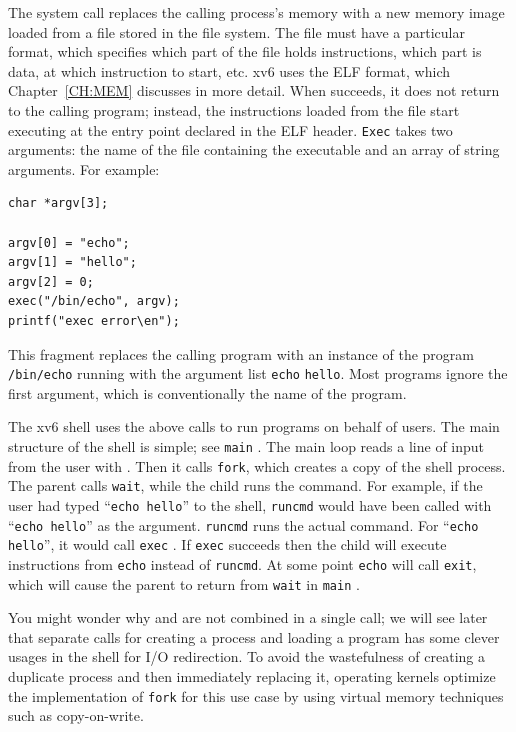 The
system call
replaces the calling process's memory with a new memory
image loaded from a file stored in the file system.
The file must have a particular format, which specifies which part of
the file holds instructions, which part is data, at which instruction
to start, etc. xv6
uses the ELF format, which Chapter~\ref{CH:MEM} discusses in
more detail.
When
succeeds, it does not return to the calling program;
instead, the instructions loaded from the file start
executing at the entry point declared in the ELF header.
\lstinline{Exec}
takes two arguments: the name of the file containing the
executable and an array of string arguments.
For example:
\begin{lstlisting}[]
char *argv[3];

argv[0] = "echo";
argv[1] = "hello";
argv[2] = 0;
exec("/bin/echo", argv);
printf("exec error\en");
\end{lstlisting}
This fragment replaces the calling program with an instance
of the program 
\lstinline{/bin/echo}
running with the argument list
\lstinline{echo}
\lstinline{hello}.
Most programs ignore the first argument, which is 
conventionally the name of the program.

The xv6 shell uses the above calls to run programs on behalf of
users. The main structure of the shell is simple; see
\lstinline{main} 
.
The main loop reads a line of input from the user with
.
Then it calls 
\lstinline{fork}, 
which creates a copy of the shell process. The
parent calls
\lstinline{wait},
while the child runs the command.  For example, if the user
had typed
``\lstinline{echo hello}''
to the shell,
\lstinline{runcmd}
would have been called with
``\lstinline{echo hello}''
as the argument.
\lstinline{runcmd} 
runs the actual command. For
``\lstinline{echo hello}'',
it would call
\lstinline{exec} 
.
If
\lstinline{exec}
succeeds then the child will execute instructions from
\lstinline{echo}
instead of
\lstinline{runcmd}.  
At some point
\lstinline{echo}
will call
\lstinline{exit},
which will cause the parent to return from
\lstinline{wait}
in 
\lstinline{main}
.

You might wonder why
and
are not combined in a single call; we will see later that separate
calls for creating a process and loading a program has some clever
usages in the shell for I/O redirection.  To avoid the wastefulness of
creating a duplicate process and then immediately replacing it,
operating kernels optimize the implementation of
\lstinline{fork}
for this use case by using virtual memory techniques such as copy-on-write.

